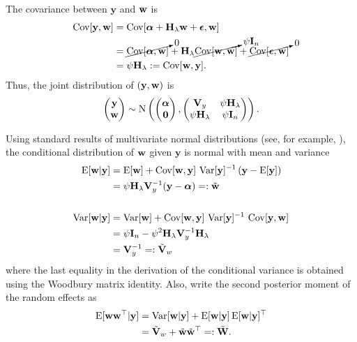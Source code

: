 The covariance between $\mathbf y$ and ${\mathbf w}$ is
\begin{align*}
\operatorname{Cov}[{\mathbf y}, {\mathbf w}] &= \operatorname{Cov}[{\bm\alpha} + \mathbf H_\lambda {\mathbf w} + {\bm\epsilon}, {\mathbf w}] \\
&= \cancelto{0}{\operatorname{Cov}[{\bm\alpha}, {\mathbf w}]} + \mathbf H_\lambda \cancelto{\psi{\mathbf I}_n}{\operatorname{Cov}[{\mathbf w}, {\mathbf w}]} +  \cancelto{0}{\operatorname{Cov}[{\bm\epsilon}, {\mathbf w}]} \\
&= \psi\mathbf H_\lambda := \operatorname{Cov}[{\mathbf w}, \mathbf y].
\end{align*}
Thus, the joint distribution of $(\mathbf y, {\mathbf w})$ is
\[
	\begin{pmatrix}
		\mathbf y \\
		{\mathbf w}
	\end{pmatrix}
	\sim \operatorname{N} \left(
	\begin{pmatrix}
		\boldsymbol{\alpha} \\
		\mathbf 0
	\end{pmatrix},
	\begin{pmatrix}
		\mathbf V_y				&\psi\mathbf H_{\lambda} \\
		\psi\mathbf H_{\lambda}	&\psi\mathbf I_n
	\end{pmatrix}
	\right).
\]

Using standard results of multivariate normal distributions (see, for example, \citealt{krzanowski2000principles}), the conditional distribution of ${\mathbf w}$ given $\mathbf y$ is normal with mean and variance
\begin{align}\label{eq:wcondy}
\operatorname{E}[{\mathbf w}|\mathbf y] &= \operatorname{E}[{\mathbf w}] + \operatorname{Cov}[{\mathbf w}, \mathbf y] \, \operatorname{Var}[\mathbf y]^{-1} \, (\mathbf y - \operatorname{E}[\mathbf y]) \nonumber  \\
&= \psi\mathbf H_{\lambda} \mathbf V_y^{-1} (\mathbf y - \boldsymbol\alpha) =: \tilde{\mathbf w} \nonumber \\
\\
\operatorname{Var}[{\mathbf w}|\mathbf y] &= \operatorname{Var}[{\mathbf w}] + \operatorname{Cov}[{\mathbf w}, \mathbf y] \, \operatorname{Var}[\mathbf y]^{-1} \, \operatorname{Cov}[\mathbf y, {\mathbf w}] \nonumber \\
&= \psi\mathbf I_n - \psi^2\mathbf H_{\lambda} \mathbf V_y^{-1} \mathbf H_{\lambda} \nonumber \\
&= {\mathbf V}_y^{-1} =: \tilde{\mathbf V}_w \nonumber
\end{align}
where the last equality in the derivation of the conditional variance is obtained using the Woodbury matrix identity. Also, write the second posterior moment of the random effects as
\begin{equation}
\begin{aligned}\label{eq:Wtilde}
	\operatorname{E}[{\mathbf w}{\mathbf w}^\top|\mathbf y] &= \operatorname{Var}[{\mathbf w}|\mathbf y] + \operatorname{E}[{\mathbf w}|\mathbf y]\operatorname{E}[{\mathbf w}|\mathbf y]^\top \\
	&= \tilde{\mathbf V}_w + \tilde{\mathbf w}\tilde{\mathbf w}^\top =: \tilde{\mathbf W}.
\end{aligned}
\end{equation}
	


